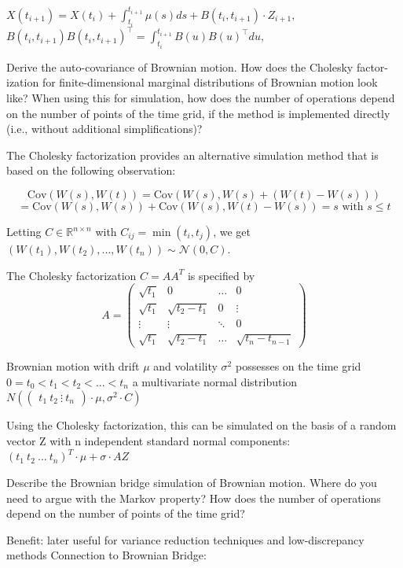 \(X(t_{i+1})=X(t_{i})+\int_{t_{i}}^{t_{i+1}}\mu(s)ds+B(t_{i},t_{i+1})\cdot Z_{i+1},\)
\(B(t_{i},t_{i+1})B(t_{i},t_{i+1})^{\top}=\int_{t_{i}}^{t_{i+1}}B(u)B(u)^{\top}du,\)

Derive the auto-covariance of Brownian motion. How does the Cholesky factor-
ization for finite-dimensional marginal distributions of Brownian motion look like?
When using this for simulation, how does the number of operations depend on
the number of points of the time grid, if the method is implemented directly (i.e.,
without additional simplifications)?

The Cholesky factorization provides an alternative simulation method that is based on the following observation:

\[ \text{Cov}(W(s), W(t)) = \text{Cov}(W(s), W(s) + (W(t) - W(s))) \]
\[ = \text{Cov}(W(s), W(s)) + \text{Cov} (W(s), W(t) - W(s)) = s \text{ with } s \leq t \]

Letting \(C \in \mathbb{R}^{n \times n}\) with \(C_{ij} = \min(t_i, t_j)\), we get \((W(t_1), W(t_2), ..., W(t_n)) \sim \mathcal{N}(0, C)\).

The Cholesky factorization \(C = AA^T\) is specified by
\[ A = 
\begin{pmatrix}
\sqrt{t_1} & 0 & \dots & 0 \\
\sqrt{t_1} & \sqrt{t_2 - t_1} & 0 & \vdots \\
\vdots & \vdots & \ddots & 0 \\
\sqrt{t_1} & \sqrt{t_2 - t_1} & \dots & \sqrt{t_n - t_{n-1}}
\end{pmatrix}
\] 

Brownian motion with drift \(\mu\) and volatility \(\sigma^2\) possesses on the time grid \(0=t_0<t_1<t_2<...<t_n\) a multivariate normal distribution
\(
N \left( \begin{pmatrix}
t_1 \ t_2 \ \vdots \ t_n
\end{pmatrix} \cdot \mu, \sigma^2 \cdot C \right)
\)

Using the Cholesky factorization, this can be simulated on the basis of a random vector Z with n independent standard normal components:
\(
(t_1 \ t_2 \ \dots \ t_n)^T \cdot \mu + \sigma \cdot A Z
\)


Describe the Brownian bridge simulation of Brownian motion. Where do you need
to argue with the Markov property? How does the number of operations depend
on the number of points of the time grid?

Benefit: later useful for variance reduction techniques and low-discrepancy methods
Connection to Brownian Bridge:

